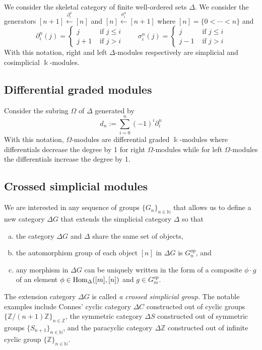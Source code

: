 \documentclass[a4paper,11pt]{amsart}
\theoremstyle{definition}
\newcommand{\B}[1]{\mathbb{#1}}
\newcommand{\Hom}{\text{\rm Hom}}
\newcommand{\Simp}{{\Delta}}
\newcommand{\Diff}{{\Omega}}
\newcommand{\xla}[1]{\xleftarrow{#1}}
\begin{document}
We consider the skeletal category of finite well-ordered sets $\Delta$. We consider the generators
$[n+1]\xla{\partial^n_i}[n]$ and $[n]\xla{\sigma^n_i}[n+1]$ where
$[n]=\{0<\cdots<n\}$ and
\[ \partial^n_i(j) =
  \begin{cases}
    j   & \text{ if } j\leq i\\
    j+1 & \text{ if } j> i
  \end{cases}
  \qquad
  \sigma^n_i(j) =
  \begin{cases}
    j   & \text{ if } j\leq i\\
    j-1 & \text{ if } j> i
  \end{cases}
\]
With this notation, right and left $\Simp $-modules respectively are simplicial and cosimplicial $\Bbbk$-modules.

\subsection{Differential graded modules}

Consider the subring $\Diff$ of $\Simp $ generated by
\[ d_n := \sum_{i=0}^n (-1)^i \partial^n_i \] With this notation, $\Diff$-modules are differential
graded $\Bbbk$-modules where differentials decrease the degree by 1 for right $\Diff$-modules while
for left $\Diff$-modules the differentials increase the degree by 1.

\subsection{Crossed simplicial modules} \cite[1.1. Definition]{fiedorowicz1991crossed} We are interested in any sequence of groups $\{G_n\}_{n\in\B{N}}$ that allows us to define a new category $\Simp G$ that extends the simplicial category $\Simp$ so that 
\begin{enumerate}[(a)]
    \item the category $\Simp G$ and $\Simp$ share the same set of objects,
    \item the automorphism group of each object $[n]$ in $\Simp G$ is $G_n^{op}$, and
    \item any morphism in $\Simp G$ can be uniquely written in the form of a composite $\phi \cdot g$ of an element $\phi \in \Hom_{\Delta}([m],[n])$ and $g \in G_m^{op}$.
\end{enumerate}
The extension category $\Simp G$ is called \emph{a crossed simplicial group}. The notable examples include Connes' cyclic category $\Simp C$ constructed out of cyclic groups $\{\B{Z}/(n+1)\B{Z}\}_{n\in\B{Z}}$, the symmetric category $\Simp S$ constructed out of symmetric groups $\{S_{n+1}\}_{n\in\B{N}}$, and the paracyclic category $\Simp \B{Z}$ constructed out of infinite cyclic group $\{\B{Z}\}_{n\in\B{N}}$.
\end{document}
